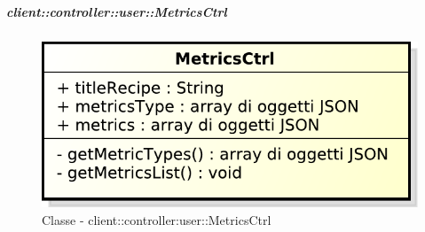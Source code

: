 		\subparagraph{client::controller::user::MetricsCtrl} %
		\label{subp:client_controller_user_metricsctrl}
			\begin{figure}[htbp]
				\centering
				\centerline{\includegraphics[scale=0.7]{./images/client/classes/controller/metrics_ctrl.pdf}}
				\caption{Classe - client::controller:user::MetricsCtrl}
			\end{figure}

